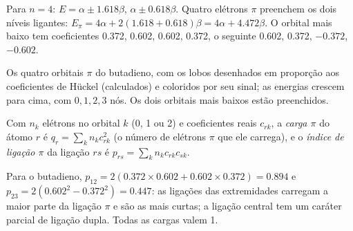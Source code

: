 \begin{example}[Butadieno]\label{ex:b2:huckel:butadiene}
Para $n = 4$: $E = \alpha \pm 1.618\beta$, $\alpha \pm 0.618\beta$. Quatro elétrons $\pi$ preenchem os dois
níveis ligantes: $E_\pi = 4\alpha + 2(1.618 + 0.618)\beta = 4\alpha + 4.472\beta$. O orbital
mais baixo tem coeficientes 0.372, 0.602, 0.602, 0.372, o seguinte 0.602, 0.372,
$-0.372$, $-0.602$.
\end{example}

\begin{omfigure}

{\small Os quatro orbitais $\pi$ do butadieno, com os lobos desenhados em
proporção aos coeficientes de Hückel (calculados) e coloridos por seu sinal; as
energias crescem para cima, com $0, 1, 2, 3$ nós. Os dois orbitais mais baixos
estão preenchidos.}
\end{omfigure}

\begin{definition}\label{def:b2:huckel:indices}
Com $n_k$ elétrons no orbital $k$ (0, 1 ou 2) e coeficientes reais $c_{rk}$, a
\emph{carga $\pi$} do átomo $r$ é $q_r = \sum_k n_kc_{rk}^2$ (o
número de elétrons $\pi$ que ele carrega), e o \emph{índice de ligação $\pi$}
da ligação $rs$ é $p_{rs} = \sum_k n_kc_{rk}c_{sk}$.
\end{definition}

Para o butadieno, $p_{12} = 2(0.372 \times 0.602 + 0.602 \times 0.372) = 0.894$ e $p_{23} =
2(0.602^2 - 0.372^2) = 0.447$: as ligações das extremidades carregam a maior
parte da ligação $\pi$ e são as mais curtas; a ligação central tem um caráter
parcial de ligação dupla. Todas as cargas valem 1.

